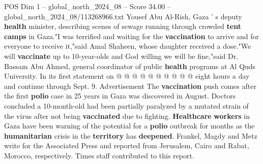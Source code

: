 \begin{textsample}{POS Dim 1 – global\_north\_2024\_08 – Score 34.00 – global\_north\_2024\_08/113268966.txt}
Yousef Abu Al-Rish, Gaza ' s deputy \textbf{health} minister, describing scenes of sewage running through crowded \textbf{tent} \textbf{camps} in Gaza."I was terrified and waiting for the \textbf{vaccination} to arrive and for everyone to receive it,"said Amal Shaheen, whose daughter received a dose."We will \textbf{vaccinate} up to 10-year-olds and God willing we will be fine,"said Dr.
Bassam Abu Ahmed, general coordinator of public \textbf{health} programs at Al Quds University.
In its first statement on @ @ @ @ @ @ @ @ @ @ eight hours a day and continue through Sept. 9.
Advertisement The \textbf{vaccination} push comes after the first \textbf{polio} case in 25 years in Gaza was discovered in August.
Doctors concluded a 10-month-old had been partially paralyzed by a mutated strain of the virus after not being \textbf{vaccinated} due to fighting. \textbf{Healthcare} \textbf{workers} in Gaza have been warning of the potential for a \textbf{polio} outbreak for months as the \textbf{humanitarian} crisis in the \textbf{territory} has \textbf{deepened}.
Frankel, Magdy and Metz write for the Associated Press and reported from Jerusalem, Cairo and Rabat, Morocco, respectively.
Times staff contributed to this report.

\end{textsample}
